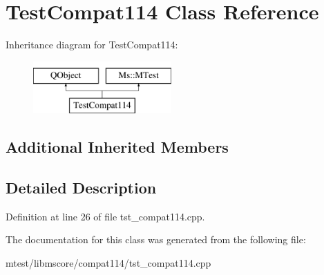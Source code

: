 \hypertarget{class_test_compat114}{}\section{Test\+Compat114 Class Reference}
\label{class_test_compat114}
Inheritance diagram for Test\+Compat114\+:\begin{figure}[H]
\begin{center}
\leavevmode
\includegraphics[height=2.000000cm]{class_test_compat114}
\end{center}
\end{figure}
\subsection*{Additional Inherited Members}


\subsection{Detailed Description}


Definition at line 26 of file tst\+\_\+compat114.\+cpp.



The documentation for this class was generated from the following file\+:\begin{DoxyCompactItemize}
\item 
mtest/libmscore/compat114/tst\+\_\+compat114.\+cpp\end{DoxyCompactItemize}
